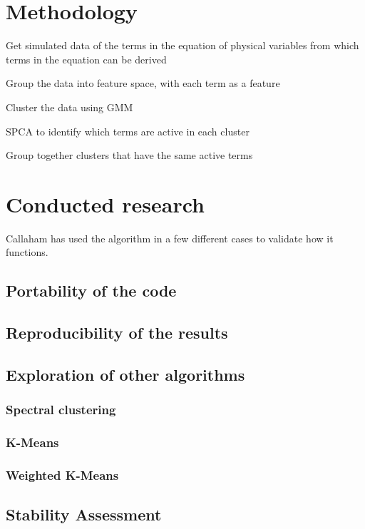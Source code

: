 \documentclass[12pt]{report} %
\begin{document}
\chapter{Methodology}


Get simulated data of the terms in the equation of physical variables from which terms in the equation can be derived

Group the data into feature space, with each term as a feature

Cluster the data using GMM

SPCA to identify which terms are active in each cluster

Group together clusters that have the same active terms


\chapter{Conducted research}

Callaham has used the algorithm in a few different cases to validate how it functions.



\section{Portability of the code}

\section{Reproducibility of the results}

\section{Exploration of other algorithms}

\subsection{Spectral clustering}

\subsection{K-Means}

\subsection{Weighted K-Means}

\section{Stability Assessment}
\end{document}
